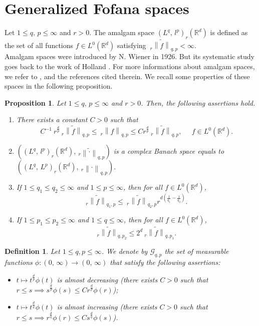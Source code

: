 \documentclass[a4paper,12pt,intlimits,oneside]{amsart}
\numberwithin{equation}{section}
\newtheorem{definition}[theorem]{Definition}
\newtheorem{proposition}[theorem]{Proposition}
\numberwithin{equation}{section}
\theoremstyle{definition}
\begin{document}
\section{Generalized Fofana spaces}
 Let $1\leq q,\, p \leq\infty$ and $r>0$. The amalgam space $(L^{q},\, l^{p})_{r}(\mathbb{R}^{d})$ is defined as the set of all functions $f \in L^{0}(\mathbb{R}^{d})$ satisfying $ \: _{r}\widetilde{\left\|f\right\|}_{q,p}<\infty$. \\
  Amalgam spaces were introduced by N. Wiener \cite{W} in 1926. But its systematic study goes back to the work
  of Holland \cite{FH}. For more informations about amalgam spaces, we refer to \cite{JF}, \cite{FS2} and the references cited therein. We recall some properties of these spaces in the following proposition.
 \begin{proposition} \label{prop 3}
Let $1\leq q,\, p \leq\infty$ and $r>0$. Then, the following assertions
hold.
\begin{enumerate}
\item  There exists a constant $ C>0 $ such that
$$C^{-1}\:r^{\frac{d}{p}}\:_{r}\widetilde{\left\|f\right\|}_{q,p}\leq \: _{r}\left\|f\right\|_{q,p} \leq C r^{\frac{d}{p}}\:_{r}\widetilde{\left\|f\right\|}_{q,p},\;\;\;\;\; f \in L^{0}(\mathbb{R}^{d}).$$
\item  $((L^{q},\, l^{p})_{r}(\mathbb{R}^{d}),   \: _{r}\widetilde{\left\|\cdot  \right\|}_{q,p}) $ is a complex Banach space equals to \\ $((L^{q},\, L^{p})_{r}(\mathbb{R}^{d}),   \: _{r}\left\|\cdot  \right\|_{q,p}) .$ 
\item If  $1\leq q_{1}\leq q_{2}\leq \infty$ and $1\leq p \leq \infty$, then for all $f \in L^{0}(\mathbb{R}^{d})$,
 $$ _{r}\widetilde{\left\|f\right\|}_{q_{1},p} \leq \: _{r}\widetilde{\left\|f\right\|}_{q_{2},p} r^{d({\frac{1}{q_{1}} - \frac{1}{q_{2}}})}.$$
\item If $1\leq p_{1}\leq p_{2}\leq\infty$ and $1\leq q \leq \infty$, then for all $f \in L^{0}(\mathbb{R}^{d})$, 
  $$_{r}\widetilde{\left\| f \right\|}_{q,p_{2}} \leq 2^{d} \: _{r}\widetilde{\left\|f\right\|}_{q,p_{1}}.$$
\end{enumerate}
 \end{proposition} 


\begin{definition}
Let $1\leq q, p\leq \infty$. We denote by $\mathcal{G}_{q,p}$ the set of measurable functions $\phi : (0,\,\infty) \to (0, \,\infty)$ that satisfy the following assertions: 
 \begin{itemize}
\item $ t \mapsto t^{\frac{d}{p}} \phi(t) $ is almost decreasing (there exists $ C > 0$ such that $ r \leq s \implies s^{\frac{d}{p}}\phi(s)  \leq C r^{\frac{d}{p}}\phi(r) $);
\item $ t \mapsto t^{\frac{d}{q}} \phi(t) $ is almost increasing (there exists $ C > 0$ such that $ r \leq s \implies r^{\frac{d}{q}}\phi(r)  \leq C s^{\frac{d}{q}}\phi(s)$).
 \end{itemize}
\end{definition}
\end{document}
